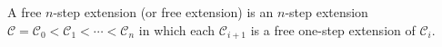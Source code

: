 A free $n$-step extension (or free extension) is an $n$-step extension $\mathcal{C} = \mathcal{C}_0 < \mathcal{C}_1 < \cdots < \mathcal{C}_n$ in which each $\mathcal{C}_{i+1}$ is a free one-step extension of $\mathcal{C}_i$.
